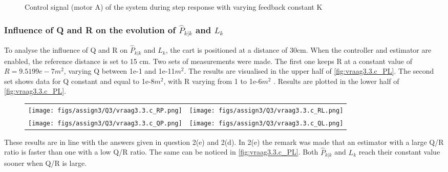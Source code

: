 \documentclass[a4paper]{article}
\newcommand{\newpar}{\vspace{.3cm}\noindent}
\begin{document}
\begin{figure}[H]
    \caption{Control signal (motor A) of the system during step response with varying feedback constant K}
    \label{fig:vraag3.3.b voltage}
\end{figure}


\subsubsection{Influence of Q and R on the evolution of \(\hat{P}_{k|k}\) and \(L_{k}\)}
To analyse the influence of Q and R on \(\hat{P}_{k|k}\) and \(L_{k}\), the cart is positioned at a distance of 30cm. When the controller and estimator are enabled, the reference distance is set to 15 cm. Two sets of measurements were made. The first one keeps R at a constant value of \(R=9.5199e-7m^2\), varying Q between 1e-1 and 1e-11\(m^2\). The results are visualised in the upper half of \autoref{fig:vraag3.3.c_PL}. The second set shows data for Q constant and equal to 1e-8\(m^2\), with R varying from 1 to 1e-6\(m^2\) . Results are plotted in the lower half of \autoref{fig:vraag3.3.c_PL}.

\begin{figure}[H]
\begin{adjustwidth}{-3cm}{-3cm}
\centering
\begin{tabular}{cc}
  \texttt{[image: figs/assign3/Q3/vraag3.3.c\_RP.png]} &   \texttt{[image: figs/assign3/Q3/vraag3.3.c\_RL.png]} \\
  
  \texttt{[image: figs/assign3/Q3/vraag3.3.c\_QP.png]} & \texttt{[image: figs/assign3/Q3/vraag3.3.c\_QL.png]} \\
\end{tabular}
\end{adjustwidth}
\label{fig:vraag3.3.c_PL}
\end{figure}

\newpar
These results are in line with the answers given in question 2(e) and 2(d). In 2(e) the remark was made that an estimator with a large Q/R ratio is faster than one with a low Q/R ratio. The same can be noticed in \autoref{fig:vraag3.3.c_PL}. Both \(\hat{P}_{k|k}\) and \(L_{k}\) reach their constant value sooner when Q/R is large. 
\end{document}
